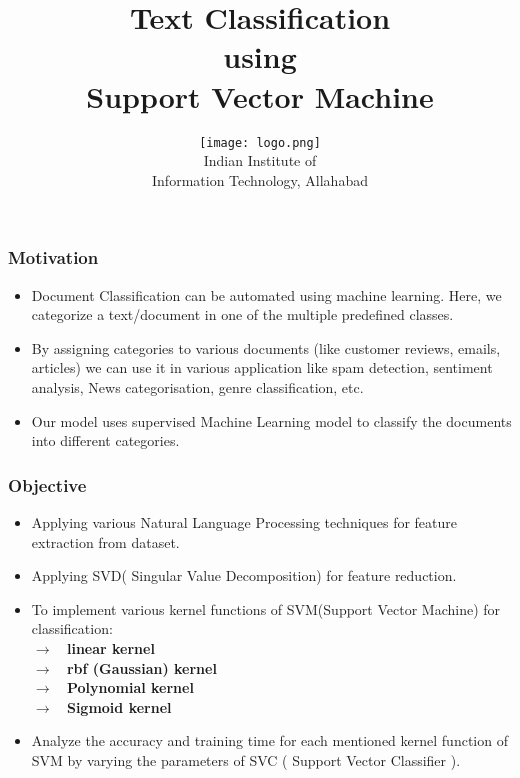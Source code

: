 \documentclass{beamer}
\date[]{}
\newcommand\tab[1][1cm]{\hspace*{#1}}
\begin{document}
\title{Text Classification\\ using\\ Support Vector Machine}
\author{\texttt{[image: logo.png]}\\[.0cm]  Indian Institute of \\Information Technology, Allahabad}

\begin{frame}
\titlepage %
\end{frame}


\begin{frame}
\frametitle{\tab \tab \tab \tab \quad \huge Motivation}
\begin{itemize}
\item Document Classification can be automated using machine learning.
Here, we categorize a text/document in one of the multiple
predefined classes.\\
\item By assigning categories to various documents (like customer
reviews, emails, articles) we can use it in various application like
spam detection, sentiment analysis, News categorisation, genre
classification, etc. \\
\item Our model uses supervised Machine Learning model to classify the
documents into different categories. \\
\end{itemize}
\end{frame}

\begin{frame}
\frametitle{\tab \tab \tab \tab \quad \huge Objective}
\begin{itemize}
\item Applying various Natural Language Processing techniques for
feature extraction from dataset.\\
\item Applying SVD( Singular Value Decomposition) for feature reduction. \\
\item To implement various kernel functions of SVM(Support Vector
Machine) for classification: \\
\textbf{\tab $\rightarrow$ \ linear kernel \\}
\textbf{\tab $\rightarrow$ \ rbf (Gaussian) kernel \\}
\textbf{\tab $\rightarrow$ \ Polynomial kernel \\}
\textbf{\tab $\rightarrow$ \ Sigmoid kernel \\}
\item Analyze the accuracy and training time for each mentioned kernel function
of SVM by varying the parameters of SVC ( Support Vector Classifier ).
\end{itemize}
\end{frame}
\end{document}
